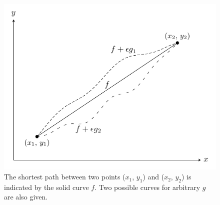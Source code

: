 \begin{figure}[ht] 
    \centering
    \includegraphics[keepaspectratio, width = 4.0 in]{images/shortest_path}
    \caption{The shortest path between two points ($x_1$, $y_1$) and 
            ($x_2$, $y_2$) is indicated by the solid curve $f$.  Two possible
            curves for arbitrary $g$ are also given.}
    \label{fig:shortest_path}
\end{figure} 

